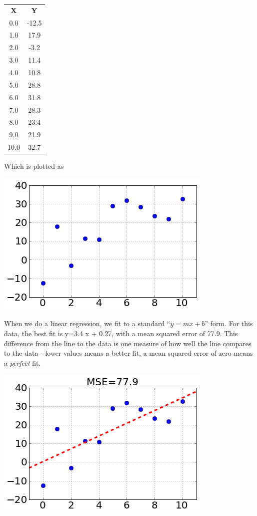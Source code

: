 \vspace{.1in}
\begin{tabular}{cc}
\toprule
\textbf{X} & \textbf{Y}\\
0.0 & -12.5\\
1.0 & 17.9\\
2.0 & -3.2\\
3.0 & 11.4\\
4.0 & 10.8\\
5.0 & 28.8\\
6.0 & 31.8\\
7.0 & 28.3\\
8.0 & 23.4\\
9.0 & 21.9\\
10.0 & 32.7\\
\bottomrule
\end{tabular}
\vspace{.1in}

Which is plotted as

\includegraphics{img/fig1.png}

When we do a linear regression, we fit to a standard ``$y=mx+b$'' form.
For this data, the best fit is
\beqn
y=3.4 x + 0.27,
\eeqn
with a mean squared error of 77.9.  This difference from the line to the data is one measure of how well the line compares to the data - lower values means a better fit, a mean squared error of zero means a {\em perfect} fit.

\includegraphics{img/fig2.png}

